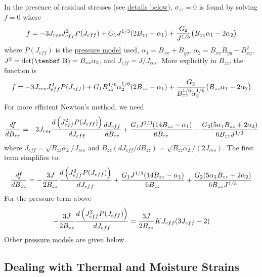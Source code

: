 \documentclass[11pt]{book}
\def\B{\hbox{\tenbsf B}}
\def\s#1{\sigma_{#1}}
\begin{document}
In the presence of residual stresses (see \hyperref[HyperRes]{details below}), $\s{zz}=0$ is found by solving $f=0$ where
\begin{equation}
       f = -3J_{res}J_{eff}^2 P(J_{eff}) + G_1 J^{1/3} (2B_{zz}-\alpha_1)+ {G_2\over J^{1/3} }\bigl( B_{zz}\alpha_1-2\alpha_2\bigr)
\end{equation}
where $P(J_{eff})$ is the \hyperref[PTerms]{pressure model} used, $\alpha_1 = B_{xx}+B_{yy}$, $\alpha_2 = B_{xx}B_{yy}-B_{xy}^2$, $J^2 = {\rm det}(\B) = B_{zz}\alpha_2$, and $J_{eff}=J/J_{res}$. More explicitly in $B_{zz}$, the function is
\begin{equation}
       f = -3J_{res}J_{eff}^2 P(J_{eff})+ G_1 B_{zz}^{1/6} \alpha_2^{1/6}(2B_{zz}-\alpha_1)+ {G_2\over B_{zz}^{1/6} \alpha_2^{1/6} }\bigl( B_{zz}\alpha_1-2\alpha_2\bigr)
\end{equation}
For more efficient Newton's method, we need
\begin{equation}
       {df\over dB_{zz}} = -3J_{res}{d \left(J_{eff}^2 P(J_{eff})\right)\over dJ_{eff}}{dJ_{eff}\over dB_{zz}} + {G_1J^{1/3}(14B_{zz}- \alpha_1)\over 6B_{zz}} 
               + {G_2(5\alpha_1B_{zz}+2\alpha_2)\over  6 B_{zz}J^{1/3}} 
\end{equation}
where $J_{eff} = \sqrt{B_{zz}\alpha_2}/J_{res}$ and $B_{zz}(dJ_{eff}/ dB_{zz}) = \sqrt{B_{zz}\alpha_2}/(2J_{res})$. The first term simplifies to:
\begin{equation}
       {df\over dB_{zz}} = -{3J\over 2B_{zz}}{d \left(J_{eff}^2 P(J_{eff})\right)\over dJ_{eff}} + {G_1J^{1/3}(14B_{zz}- \alpha_1)\over 6B_{zz}} 
               + {G_2(5\alpha_1B_{zz}+2\alpha_2)\over  6 B_{zz}J^{1/3}} 
\end{equation}
For the pressure term above
\begin{equation}
      -{3J\over 2B_{zz}}{d \left(J_{eff}^2 P(J_{eff})\right)\over dJ_{eff}} = {3 J \over 2B_{zz}}KJ_{eff}(3J_{eff}-2)
\end{equation}
Other \hyperref[PTerms]{pressure models} are given below.

\subsection{Dealing with Thermal and Moisture Strains\label{HyperRes}}
\end{document}
